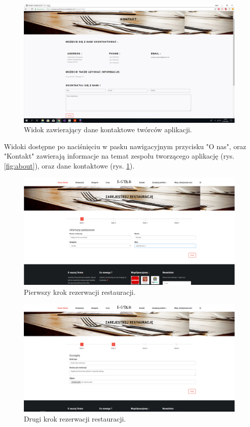 \documentclass{article}
\begin{document}
\begin{figure}[H]
\centering
	\includegraphics[width=1.00\textwidth]{screens/contact.png}
	\caption[caption]{Widok zawierający dane kontaktowe twórców aplikacji.}
	\label{fig:contact}
\end{figure}

Widoki dostępne po naciśnięciu w pasku nawigacyjnym przycisku "O nas", oraz "Kontakt" zawierają informacje na temat zespołu tworzącego aplikację (rys. \ref{fig:about}), oraz dane kontaktowe (rys. \ref{fig:contact}).

\begin{figure}[H]
\centering
	\includegraphics[width=1.00\textwidth]{screens/register_rest_1.png}
	\caption[caption]{Pierwszy krok rezerwacji restauracji.}
	\label{fig:register_rest_1}
\end{figure}

\begin{figure}[H]
\centering
	\includegraphics[width=1.00\textwidth]{screens/register_rest_2.png}
	\caption[caption]{Drugi krok rezerwacji restauracji.}
	\label{fig:register_rest_2}
\end{figure}
\end{document}
